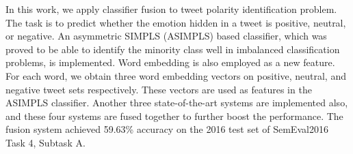 In this work, we apply classifier fusion to tweet polarity identification problem. The task is to predict whether the emotion hidden in a tweet is positive, neutral, or negative. An asymmetric SIMPLS (ASIMPLS) based classifier, which was proved to be able to identify the minority class well in imbalanced classification problems, is implemented. Word embedding is also employed as a new feature. For each word, we obtain three word embedding vectors on positive, neutral, and negative tweet sets respectively. These vectors are used as features in the ASIMPLS classifier. Another three state-of-the-art systems are implemented also, and these four systems are fused together to further boost the performance. The fusion system achieved 59.63\% accuracy on the 2016 test set of SemEval2016 Task 4, Subtask A.
